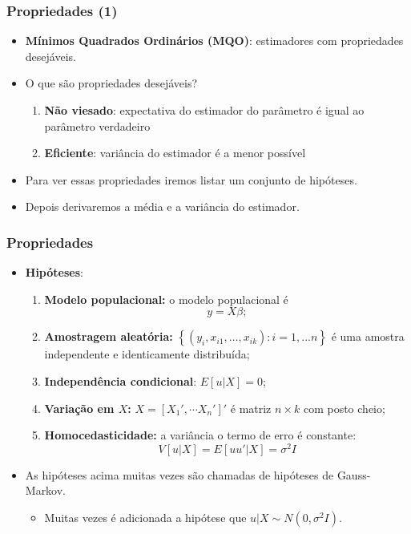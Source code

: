 \documentclass[10pt,slides,xcolor=pdftex,dvipsnames,table]{beamer}
\begin{document}

\begin{frame}[fragile]
	\frametitle{Propriedades (1)}

\begin{itemize}\itemsep1.2em

\item \textbf{Mínimos Quadrados Ordinários (MQO)}: estimadores com propriedades desejáveis.

\item O que são propriedades desejáveis?
\begin{enumerate}
\item \textbf{Não viesado}: expectativa do estimador do parâmetro é igual ao parâmetro verdadeiro
\item \textbf{Eficiente}: variância do estimador é a menor possível     
\end{enumerate}        

\item Para ver essas propriedades iremos listar um conjunto de hipóteses.

\item Depois derivaremos a média e a variância do estimador. 

\end{itemize}

\end{frame}


\begin{frame}[fragile]
	\frametitle{Propriedades}

\begin{itemize}\itemsep1.2em

\item \textbf{Hipóteses}:
\begin{enumerate}
\item \textbf{Modelo populacional:} o modelo populacional é
$$ y = X \beta;$$
\item \textbf{Amostragem aleatória:} $\left\{ (y_i, x_{i1},…, x_{ik}): i=1,...n \right\}$ é uma amostra independente e identicamente distribuída;
\item \textbf{Independência condicional}: $E[u | X ] = 0$;
\item \textbf{Variação em $X$:} $X = [X_1', \cdots X_n']'$ é matriz $n \times k$ com posto cheio;
\item \textbf{Homocedasticidade:} a variância o termo de erro é constante:
$$ V [u | X] = E [u u' | X] = \sigma^2 I $$ 
\end{enumerate}  

\item As hipóteses acima muitas vezes são chamadas de hipóteses de Gauss-Markov.
\begin{itemize}
\item Muitas vezes é adicionada a hipótese que $u | X \sim N(0, \sigma^2 I)$. 
\end{itemize}      

\end{itemize}

\end{frame}
\end{document}
